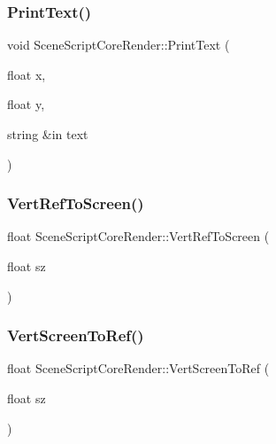 \subsubsection{\texorpdfstring{Print\+Text()}{PrintText()}}
{\footnotesize\ttfamily void Scene\+Script\+Core\+Render\+::\+Print\+Text (\begin{DoxyParamCaption}\item[{float}]{x,  }\item[{float}]{y,  }\item[{string \&in}]{text }\end{DoxyParamCaption})}

\hypertarget{class_scene_script_core_render_af227fea7325789cb2c9a9080e0595437}{}\label{class_scene_script_core_render_af227fea7325789cb2c9a9080e0595437} 
\subsubsection{\texorpdfstring{Vert\+Ref\+To\+Screen()}{VertRefToScreen()}}
{\footnotesize\ttfamily float Scene\+Script\+Core\+Render\+::\+Vert\+Ref\+To\+Screen (\begin{DoxyParamCaption}\item[{float}]{sz }\end{DoxyParamCaption})}

\hypertarget{class_scene_script_core_render_aad036446033d2df24e6045fffa5cd2e0}{}\label{class_scene_script_core_render_aad036446033d2df24e6045fffa5cd2e0} 
\subsubsection{\texorpdfstring{Vert\+Screen\+To\+Ref()}{VertScreenToRef()}}
{\footnotesize\ttfamily float Scene\+Script\+Core\+Render\+::\+Vert\+Screen\+To\+Ref (\begin{DoxyParamCaption}\item[{float}]{sz }\end{DoxyParamCaption})}

